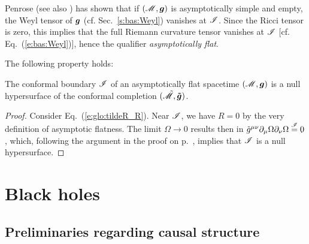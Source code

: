 Penrose \cite{Penro65b} (see also \cite{Fraue04}) has shown that if $(\mathscr{M},\bm{g})$
is asymptotically simple and empty, the Weyl tensor of $\bm{g}$ (cf. Sec.~\ref{s:bas:Weyl})
vanishes at $\mathscr{I}$. Since the
Ricci tensor is zero, this implies that the full Riemann curvature tensor vanishes
at $\mathscr{I}$ [cf. Eq.~(\ref{e:bas:Weyl})], hence the qualifier \emph{asymptotically flat}.

The following property holds:
\begin{prop}
\label{p:glo:null_scri}
The conformal boundary $\mathscr{I}$ of an asymptotically flat spacetime $(\mathscr{M},\bm{g})$
is a null hypersurface of the conformal completion $(\tilde{\mathscr{M}},\bm{\tilde{g}})$.
\end{prop}
\begin{proof}
Consider Eq.~(\ref{e:glo:tildeR_R}). Near $\mathscr{I}$, we have $R=0$ by the
very definition of asymptotic flatness. The limit $\Omega\rightarrow 0$
results then in
$\tilde{g}^{\mu\nu} \partial_\mu \Omega \partial_\nu \Omega \stackrel{\mathscr{I}}{=} 0$,
which, following the argument in the proof on p.~\pageref{e:glo:tildeR_R}, implies that
$\mathscr{I}$ is a null hypersurface.
\end{proof}



\section{Black holes} \label{s:glo:BH}

\subsection{Preliminaries regarding causal structure}  \label{s:glo:causal_struct}

